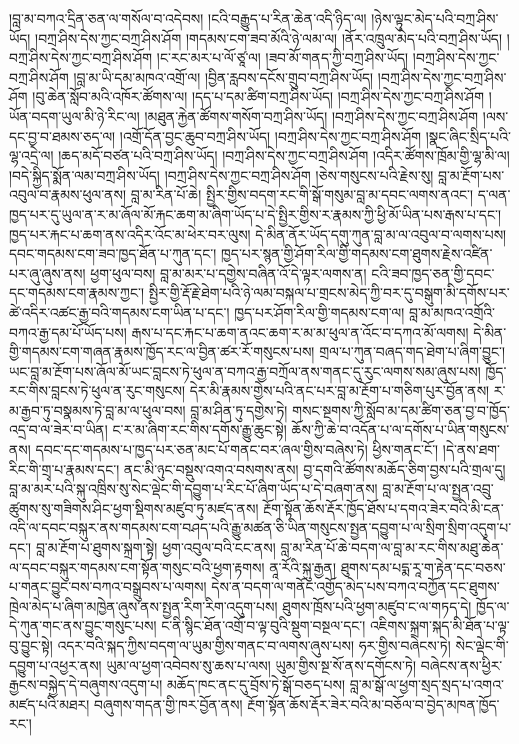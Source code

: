 \documentclass{article}
\begin{document}
།བླ་མ་བཀའ་དྲིན་ཅན་ལ་གསོལ་བ་འདེབས། །ངའི་བརྒྱུད་པ་རིན་ཆེན་འདི་ཉིད་ལ། །ཉེས་ལྟུང་མེད་པའི་བཀྲ་ཤིས་ཡོད། །བཀྲ་ཤིས་དེས་ཀྱང་བཀྲ་ཤིས་ཤོག །གདམས་ངག་ཟབ་མོའི་ཉེ་ལམ་ལ། །ནོར་འཁྲུལ་མེད་པའི་བཀྲ་ཤིས་ཡོད། །བཀྲ་ཤིས་དེས་ཀྱང་བཀྲ་ཤིས་ཤོག །ང་རང་མར་པ་ལོ་ཙཱ་ལ། །ཟབ་མོ་གནད་ཀྱི་བཀྲ་ཤིས་ཡོད། །བཀྲ་ཤིས་དེས་ཀྱང་བཀྲ་ཤིས་ཤོག །བླ་མ་ཡི་དམ་མཁའ་འགྲོ་ལ། །བྱིན་རླབས་དངོས་གྲུབ་བཀྲ་ཤིས་ཡོད། །བཀྲ་ཤིས་དེས་ཀྱང་བཀྲ་ཤིས་ཤོག །བུ་ཆེན་སློབ་མའི་འཁོར་ཚོགས་ལ། །དད་པ་དམ་ཚིག་བཀྲ་ཤིས་ཡོད། །བཀྲ་ཤིས་དེས་ཀྱང་བཀྲ་ཤིས་ཤོག །ཡོན་བདག་ཡུལ་མི་ཉེ་རིང་ལ། །མཐུན་རྐྱེན་ཚོགས་གསོག་བཀྲ་ཤིས་ཡོད། །བཀྲ་ཤིས་དེས་ཀྱང་བཀྲ་ཤིས་ཤོག །ལས་དང་བྱ་བ་ཐམས་ཅད་ལ། །འགྲོ་དོན་བྱང་ཆུབ་བཀྲ་ཤིས་ཡོད། །བཀྲ་ཤིས་དེས་ཀྱང་བཀྲ་ཤིས་ཤོག །སྣང་ཞིང་སྲིད་པའི་ལྷ་འདྲེ་ལ། །ཆད་མདོ་བཙན་པའི་བཀྲ་ཤིས་ཡོད། །བཀྲ་ཤིས་དེས་ཀྱང་བཀྲ་ཤིས་ཤོག །འདིར་ཚོགས་ཁྲོམ་གྱི་ལྷ་མི་ལ། །བདེ་སྐྱིད་སྨོན་ལམ་བཀྲ་ཤིས་ཡོད། །བཀྲ་ཤིས་དེས་ཀྱང་བཀྲ་ཤིས་ཤོག །ཅེས་གསུངས་པའི་རྗེས་སུ། བླ་མ་རྔོག་པས་འབུལ་བ་རྣམས་ཕུལ་ནས། བླ་མ་རིན་པོ་ཆེ། སྤྱིར་གྱིས་བདག་རང་གི་སྒོ་གསུམ་བླ་མ་དབང་ལགས་ནའང་། ད་ལན་ཁྱད་པར་དུ་ཡུལ་ན་ར་མ་ཞོལ་མོ་རྐང་ཆག་མ་ཞིག་ཡོད་པ་དེ་སྤྱིར་གྱིས་ར་རྣམས་ཀྱི་ཕྱི་མོ་ཡིན་པས་རྒས་པ་དང་། ཁྱད་པར་རྐང་པ་ཆག་ནས་འདིར་འོང་མ་ཕེར་བར་ལུས། དེ་མིན་ནོར་ཡོད་དགུ་ཀུན་བླ་མ་ལ་འབུལ་བ་ལགས་པས། དབང་གདམས་ངག་ཟབ་ཁྱད་ཐོན་པ་ཀུན་དང་། ཁྱད་པར་སྙན་གྱི་ཤོག་རིལ་གྱི་གདམས་ངག་ཐུགས་རྗེས་འཛིན་པར་ཞུ་ཞུས་ནས། ཕྱག་ཕུལ་བས། བླ་མ་མར་པ་དགྱེས་བཞིན་འོ་དེ་ལྟར་ལགས་ན། ངའི་ཟབ་ཁྱད་ཅན་གྱི་དབང་དང་གདམས་ངག་རྣམས་ཀྱང་། སྤྱིར་གྱི་རྡོ་རྗེ་ཐེག་པའི་ཉེ་ལམ་བསྐལ་པ་གྲངས་མེད་ཀྱི་བར་དུ་བསྒུག་མི་དགོས་པར་ཚེ་འདིར་འཚང་རྒྱ་བའི་གདམས་ངག་ཡིན་པ་དང་། ཁྱད་པར་ཤོག་རིལ་གྱི་གདམས་ངག་ལ། བླ་མ་མཁའ་འགྲོའི་བཀའ་རྒྱ་དམ་པོ་ཡོད་པས། རྒས་པ་དང་རྐང་པ་ཆག་ནའང་ཆག་ར་མ་མ་ཕུལ་ན་འོང་བ་དཀའ་མོ་ལགས། དེ་མིན་གྱི་གདམས་ངག་གཞན་རྣམས་ཁྱོད་རང་ལ་བྱིན་ཚར་རོ་གསུངས་པས། གྲལ་པ་ཀུན་བཞད་གད་ཐེག་པ་ཞིག་བྱུང་། ཡང་བླ་མ་རྔོག་པས་ཞོལ་མོ་ཡང་བླངས་ཏེ་ཕུལ་ན་བཀའ་རྒྱ་བཀྲོལ་ནས་གནང་དུ་རུང་ལགས་སམ་ཞུས་པས། ཁྱོད་རང་གིས་བླངས་ཏེ་ཕུལ་ན་རུང་གསུངས། དེར་མི་རྣམས་གྱེས་པའི་ནང་པར་བླ་མ་རྔོག་པ་གཅིག་པུར་བྱོན་ནས། ར་མ་རྒྱབ་ཏུ་བསྣམས་ཏེ་བླ་མ་ལ་ཕུལ་བས། བླ་མ་ཤིན་ཏུ་དགྱེས་ཏེ། གསང་སྔགས་ཀྱི་སློབ་མ་དམ་ཚིག་ཅན་བྱ་བ་ཁྱོད་འདྲ་བ་ལ་ཟེར་བ་ཡིན། ང་ར་མ་ཞིག་རང་གིས་དགོས་རྒྱུ་ཆུང་སྟེ། ཆོས་ཀྱི་ཆེ་བ་འདོན་པ་ལ་དགོས་པ་ཡིན་གསུངས་ནས། དབང་དང་གདམས་པ་ཁྱད་པར་ཅན་མང་པོ་གནང་བར་ཞལ་གྱིས་བཞེས་ཏེ། ཕྱིས་གནང་ངོ་། །དེ་ནས་ཐག་རིང་གི་གྲྭ་པ་རྣམས་དང་། ནང་མི་ཉུང་བསྡུས་འགའ་བསགས་ནས། བྱ་དགའི་ཚོགས་མཆོད་ཅིག་བྱས་པའི་གྲལ་དུ། བླ་མ་མར་པའི་སྐུ་འཁྲིས་སུ་སེང་ལྡེང་གི་དབྱུག་པ་རིང་པོ་ཞིག་ཡོད་པ་དེ་བཞག་ནས། བླ་མ་རྔོག་པ་ལ་སྤྱན་འབྲུ་ཚུགས་སུ་གཟིགས་ཤིང་ཕྱག་སྡིགས་མཛུབ་ཏུ་མཛད་ནས། རྔོག་སྟོན་ཆོས་རྡོར་ཁྱོད་ཐོས་པ་དགའ་ཟེར་བའི་མི་ངན་འདི་ལ་དབང་བསྐུར་ནས་གདམས་ངག་བཤད་པའི་རྒྱུ་མཚན་ཅི་ཡིན་གསུངས་སྤྱན་དབྱུག་པ་ལ་སྲིག་སྲིག་འདུག་པ་དང་། བླ་མ་རྔོག་པ་ཐུགས་སྐྲག་སྟེ། ཕྱག་འབུལ་བའི་ངང་ནས། བླ་མ་རིན་པོ་ཆེ་བདག་ལ་བླ་མ་རང་གིས་མཐུ་ཆེན་ལ་དབང་བསྐུར་གདམས་ངག་སྟོན་གསུང་བའི་ཕྱག་རྟགས། ནཱ་རོའི་སྐུ་རྒྱན། ཐུགས་དམ་པདྨ་རཱ་ག་རྟེན་དང་བཅས་པ་གནང་བྱུང་བས་བཀའ་བསྒྲུབས་པ་ལགས། དེས་ན་བདག་ལ་གནོང་འགྱོད་མེད་པས་བཀའ་བཀྱོན་དང་ཐུགས་ཁྲེལ་མེད་པ་ཞིག་མཁྱེན་ཞུས་ནས་སྤྱན་རིག་རིག་འདུག་པས། ཐུགས་ཁྲོས་པའི་ཕྱག་མཛུབ་ང་ལ་གཏད་དེ། ཁྱོད་ལ་དེ་ཀུན་གང་ནས་བྱུང་གསུང་པས། ང་ནི་སྙིང་ཐོན་འགྲོ་བ་ལྟ་བུའི་སྡུག་བསྔལ་དང་། འཇིགས་སྐྲག་སྐད་མི་ཐོན་པ་ལྟ་བུ་བྱུང་སྟེ། འདར་བའི་སྐད་ཀྱིས་བདག་ལ་ཡུམ་གྱིས་གནང་བ་ལགས་ཞུས་པས། ཧར་གྱིས་བཞེངས་ཏེ། སེང་ལྡེང་གི་དབྱུག་པ་འཕྱར་ནས། ཡུམ་ལ་ཕྱག་འབེབས་སུ་ཆས་པ་ལས། ཡུམ་གྱིས་སྔ་སོ་ནས་དགོངས་ཏེ། བཞེངས་ནས་ཕྱིར་རྒྱངས་བསྐྱེད་དེ་བཞུགས་འདུག་པ། མཆོད་ཁང་ནང་དུ་བྲོས་ཏེ་སྒོ་བཅད་པས། བླ་མ་སྒོ་ལ་ཕྱག་སྲད་སྲད་པ་འགའ་མཛད་པའི་མཐར། བཞུགས་གདན་གྱི་ཁར་བྱོན་ནས། རྔོག་སྟོན་ཆོས་རྡོར་ཟེར་བའི་མ་བཅོལ་བ་བྱེད་མཁན་ཁྱོད་རང་། 
\end{document}
